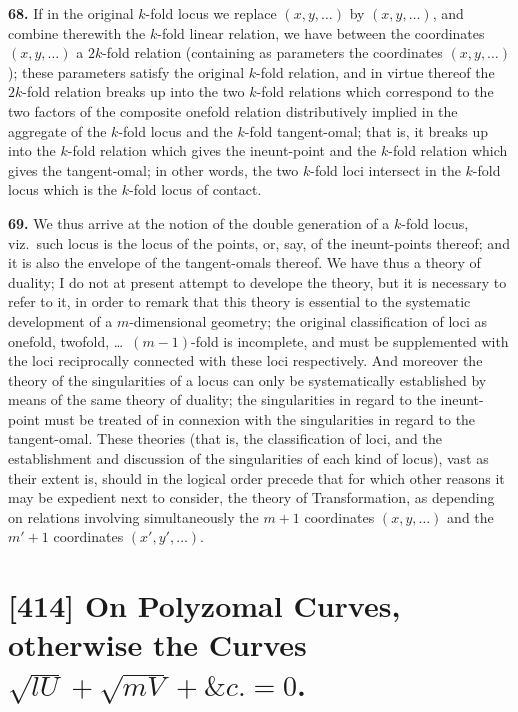 \documentclass[11pt,a4paper]{article}
\theoremstyle{definition}
\begin{document}
\setcounter{page}{469}

\noindent\textbf{68.} If in the original $k$-fold locus we replace $(x,y,\ldots)$ by $(x,y,\ldots)$, and combine therewith the $k$-fold linear relation, we have between the coordinates $(x,y,\ldots)$ a $2k$-fold relation (containing as parameters the coordinates $(x,y,\ldots)$); these parameters satisfy the original $k$-fold relation, and in virtue thereof the $2k$-fold relation breaks up into the two $k$-fold relations which correspond to the two factors of the composite onefold relation distributively implied in the aggregate of the $k$-fold locus and the $k$-fold tangent-omal; that is, it breaks up into the $k$-fold relation which gives the ineunt-point and the $k$-fold relation which gives the tangent-omal; in other words, the two $k$-fold loci intersect in the $k$-fold locus which is the $k$-fold locus of contact.

\noindent\textbf{69.} We thus arrive at the notion of the double generation of a $k$-fold locus, viz.\ such locus is the locus of the points, or, say, of the ineunt-points thereof; and it is also the envelope of the tangent-omals thereof. We have thus a theory of duality; I do not at present attempt to develope the theory, but it is necessary to refer to it, in order to remark that this theory is essential to the systematic development of a $m$-dimensional geometry; the original classification of loci as onefold, twofold, \ldots\ $(m-1)$-fold is incomplete, and must be supplemented with the loci reciprocally connected with these loci respectively. And moreover the theory of the singularities of a locus can only be systematically established by means of the same theory of duality; the singularities in regard to the ineunt-point must be treated of in connexion with the singularities in regard to the tangent-omal. These theories (that is, the classification of loci, and the establishment and discussion of the singularities of each kind of locus), vast as their extent is, should in the logical order precede that for which other reasons it may be expedient next to consider, the theory of Transformation, as depending on relations involving simultaneously the $m+1$ coordinates $(x,y,\ldots)$ and the $m'+1$ coordinates $(x',y',\ldots)$.



\newpage
\section*{[414] On Polyzomal Curves, otherwise the Curves $\sqrt{lU}+\sqrt{mV}+\&c.=0$.}
\end{document}
